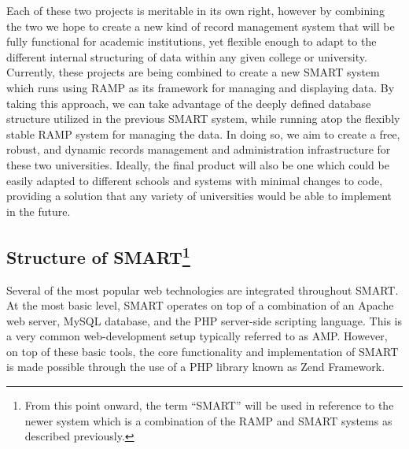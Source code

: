\documentclass[12pt]{article}
\begin{document}
Each of these two projects is meritable in its own right, however by combining the two we hope to create a new kind of record management system that will be fully functional for academic institutions, yet flexible enough to adapt to the different internal structuring of data within any given college or university. Currently, these projects are being combined to create a new SMART system which runs using RAMP as its framework for managing and displaying data. By taking this approach, we can take advantage of the deeply defined database structure utilized in the previous SMART system, while running atop the flexibly stable RAMP system for managing the data. In doing so, we aim to create a free, robust, and dynamic records management and administration infrastructure for these two universities. Ideally, the final product will also be one which could be easily adapted to different schools and systems with minimal changes to code, providing a solution that any variety of universities would be able to implement in the future.

\subsection[Structure of SMART]{Structure of SMART\footnote{From this point onward, the term ``SMART'' will be used in reference to the newer system which is a combination of the RAMP and SMART systems as described previously.}}

Several of the most popular web technologies are integrated throughout SMART. At the most basic level, SMART operates on top of a combination of an Apache web server, MySQL database, and the PHP server-side scripting language. This is a very common web-development setup typically referred to as AMP. However, on top of these basic tools, the core functionality and implementation of SMART is made possible through the use of a PHP library known as Zend Framework.
\end{document}
